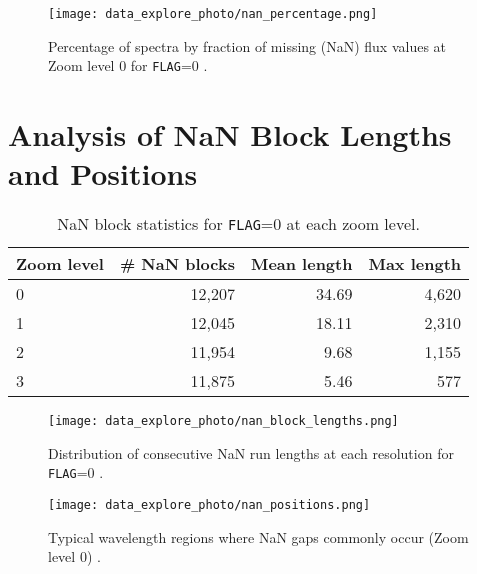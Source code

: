 \documentclass[english,bachelor,oneside]{ctufit-thesis}
\begin{document}
\begin{figure}[H]
    \centering
    \texttt{[image: data\_explore\_photo/nan\_percentage.png]}
    \caption{Percentage of spectra by fraction of missing (NaN) flux values at Zoom level 0 for \texttt{FLAG}=0 \cite{data_exploring} .}
    \label{fig:nan_percentage}
\end{figure}

\section{Analysis of NaN Block Lengths and Positions}
\begin{table}[H]
  \centering
  \caption{NaN block statistics for \texttt{FLAG}=0 at each zoom level.}
  \label{tab:nan_blocks}
  \begin{tabular}{@{}lrrr@{}}
    \toprule
    Zoom level & \# NaN blocks & Mean length & Max length \\
    \midrule
    0 & 12,207 & 34.69 & 4,620 \\
    1 & 12,045 & 18.11 & 2,310 \\
    2 & 11,954 & 9.68  & 1,155 \\
    3 & 11,875 & 5.46  & 577   \\
    \bottomrule
  \end{tabular}
\end{table}

\begin{figure}[H]
    \centering
    \texttt{[image: data\_explore\_photo/nan\_block\_lengths.png]}
    \caption{Distribution of consecutive NaN run lengths at each resolution for \texttt{FLAG}=0 \cite{data_exploring} .}
    \label{fig:nan_block_lengths}
\end{figure}

\begin{figure}[H]
    \centering
    \texttt{[image: data\_explore\_photo/nan\_positions.png]}
    \caption{Typical wavelength regions where NaN gaps commonly occur (Zoom level 0) \cite{data_exploring} .}
    \label{fig:nan_positions}
\end{figure}
\end{document}
